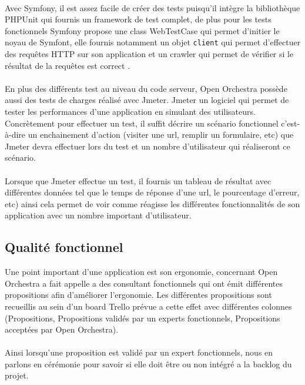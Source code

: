   \paragraph{}
 Avec Symfony, il est assez facile de créer des tests puisqu'il intègre la bibliothèque PHPUnit qui fournis un framework de test complet, de plus pour les tests fonctionnels Symfony propose une class WebTestCase qui permet d'initier le noyau de Symfont, elle fournis notamment un objet \verb?client? qui permet d'effectuer des requêtes HTTP sur son application et un crawler qui permet de vérifier si le résultat de la requêtes est correct .
  \paragraph{}
  En plus des différents test au niveau du code serveur, Open Orchestra possède aussi des tests de charges réalisé avec Jmeter. Jmeter un logiciel qui permet de tester les performances d'une application en simulant des utilisateurs. Concrètement pour effectuer un test, il suffit décrire un scénario fonctionnel c'est-à-dire un enchainement d'action (visiter une url, remplir un formulaire, etc) que Jmeter devra effectuer lors du test et un nombre d'utilisateur qui réaliseront ce scénario.
  
  \paragraph{}
  Lorsque que Jmeter effectue un test, il fournis un tableau de résultat avec différentes données tel que le temps de réponse d'une url, le pourcentage d'erreur, etc) ainsi cela permet de voir comme réagisse les différentes fonctionnalités de son application avec un nombre important d'utilisateur.
\subsection{Qualité fonctionnel}
Une point important d'une application est son ergonomie, concernant Open Orchestra  
a fait appelle a des consultant fonctionnels qui ont émit différentes propositions afin d'améliorer l'ergonomie.  Les différentes propositions sont recueillis au sein d'un board Trello prévue a cette effet avec différentes colonnes  (Propositions, Propositions validés par un experts fonctionnels, Propositions acceptées par Open Orchestra). 
  \paragraph{}
  Ainsi lorsqu'une proposition est validé par un expert fonctionnels, nous en parlons en cérémonie pour savoir si elle doit être ou non intégré a la backlog du projet. 